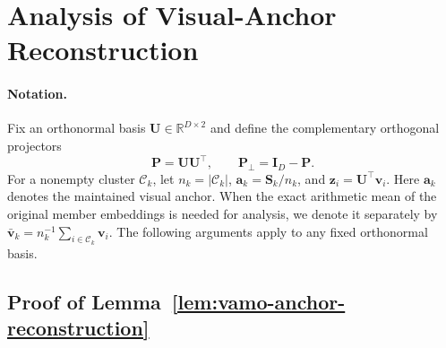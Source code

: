 \section{Analysis of Visual-Anchor Reconstruction}
\label{app:vamo-reconstruction}

\paragraph{Notation.}
Fix an orthonormal basis
$\mathbf{U}\in\mathbb{R}^{D\times 2}$ and define the complementary
orthogonal projectors
\begin{equation*}
    \mathbf{P}=\mathbf{U}\mathbf{U}^{\top},
    \qquad
    \mathbf{P}_{\perp}=\mathbf{I}_{D}-\mathbf{P}.
\end{equation*}
For a nonempty cluster $\mathcal{C}_k$, let
$n_k=|\mathcal{C}_k|$,
$\mathbf{a}_k=\mathbf{S}_k/n_k$, and
$\mathbf{z}_i=\mathbf{U}^{\top}\mathbf{v}_i$.
Here $\mathbf{a}_k$ denotes the maintained visual anchor.
When the exact arithmetic mean of the original member embeddings is
needed for analysis, we denote it separately by
$\bar{\mathbf{v}}_k
=n_k^{-1}\sum_{i\in\mathcal{C}_k}\mathbf{v}_i$.
The following arguments apply to any fixed orthonormal basis.

\subsection{Proof of Lemma~\ref{lem:vamo-anchor-reconstruction}}
\label{app:vamo-projection-proof}

